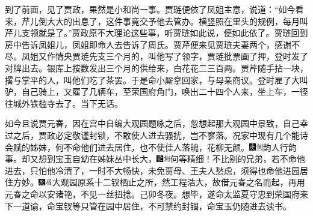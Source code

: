 到了前面，见了贾政，果然是小和尚一事。贾琏便依了凤姐主意，说道：``如今看来，芹儿倒大大的出息了，这件事竟交予他去管办。横竖照在里头的规例，每月叫芹儿支领就是了。''贾政原不大理论这些事，听贾琏如此说，便如此依了。贾琏回到房中告诉凤姐儿，凤姐即命人去告诉了周氏。贾芹便来见贾琏夫妻两个，感谢不尽。凤姐又作情央贾琏先支三个月的，叫他写了领字，贾琏批票画了押，登时发了对牌出去。银库上按数发出三个月的供给来，白花花二三百两。贾芹随手拈一块，撂与掌平的人，叫他们吃了茶罢。于是命小厮拿回家，与母亲商议。登时雇了大叫驴，自己骑上，又雇了几辆车，至荣国府角门，唤出二十四个人来，坐上车，一径往城外铁槛寺去了。当下无话。

如今且说贾元春，因在宫中自编大观园题咏之后，忽想起那大观园中景致，自己幸过之后，贾政必定敬谨封锁，不敢使人进去骚扰，岂不寥落。况家中现有几个能诗会赋的姊妹，何不命他们进去居住，也不使佳人落魄，花柳无颜。{\includegraphics[width=3mm]{../Images/00004}\includegraphics[width=3mm]{../Images/00011}\footnotesize \kaishu 韵人行韵事。}却又想到宝玉自幼在姊妹丛中长大，{\includegraphics[width=3mm]{../Images/00006}\includegraphics[width=3mm]{../Images/00011}\footnotesize \kaishu 何等精细！}不比别的兄弟，若不命他进去，只怕他冷清了，一时不大畅快，未免贾母、王夫人愁虑，须得也命他进园居住方妙。{\includegraphics[width=3mm]{../Images/00004}\includegraphics[width=3mm]{../Images/00010}\footnotesize \kaishu 大观园原系十二钗栖止之所，然工程浩大，故借元春之名而起，再用元春之命以安诸艳，不见一丝扭捻。己卯冬夜。}想毕，遂命太监夏守忠到荣国府来下一道谕，命宝钗等只管在园中居住，不可禁约封锢，命宝玉仍随进去读书。

